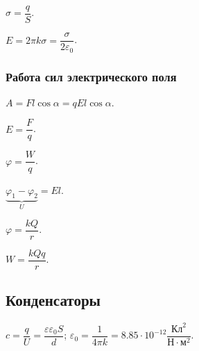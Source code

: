 \documentclass[12pt]{article}
\begin{document}
	\begin{definition}
		$\sigma = \dfrac{q}{S}$.
	\end{definition}
	
	\begin{definition}
		$E = 2 \pi k \sigma = \dfrac{\sigma}{2 \varepsilon_0}$.
	\end{definition}
	
	\subsubsection{Работа сил электрического поля}
	
	\begin{definition}
		$A = F l \cos \alpha = q E l \cos \alpha$.
	\end{definition}
	
	\begin{statement}
		$E = \dfrac{F}{q}$.
	\end{statement}
	
	\begin{definition}
		$\varphi = \dfrac{W}{q}$.
	\end{definition}
	
	\begin{statement}
		$\underbrace{\varphi_1 - \varphi_2}_U = El$.
	\end{statement}
	
	\begin{statement}
		$\varphi = \dfrac{kQ}{r}$.
	\end{statement}
	
	\begin{definition}
		$W = \dfrac{kQq}{r}$.
	\end{definition}
	
	\subsection{Конденсаторы}
	
	\begin{definition}
		$c = \dfrac{q}{U} = \dfrac{\varepsilon \varepsilon_0 S}{d}$; $\varepsilon_0 = \dfrac{1}{4 \pi k} = 8.85 \cdot 10^{-12} \dfrac{\text{Кл}^2}{\text{Н} \cdot \text{м}^2}$.
	\end{definition}
	
\end{document}
